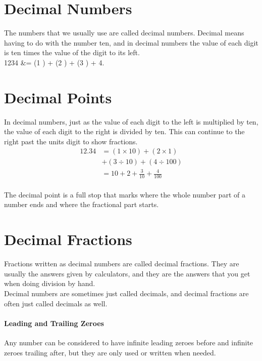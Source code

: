 \documentclass{article}
\author{}
\date{}
\begin{document}
\maketitle

\section{Decimal Numbers}
The numbers that we usually use are called decimal numbers. Decimal means having to do with the number ten, and in decimal numbers the value of each digit is ten times the value of the digit to its left.\\

1234 &= (1 ) + (2 ) + (3 ) + 4.\\

\section{Decimal Points}

In decimal numbers, just as the value of each digit to the left is multiplied by ten, the value of each digit to the right is divided by ten. This can continue to the right past the units digit to show fractions.
\begin{align*}
12.34 &= (1 \times 10) + (2 \times 1)\\
      &+ (3 \div 10) + (4 \div100)\\
      &= 10 + 2 + \frac{3}{10} + \frac{4}{100}\\
\end{align*}

The decimal point is a full stop that marks where the whole number part of a number ends and where the fractional part starts.\\

\section{Decimal Fractions}

Fractions written as decimal numbers are called decimal fractions. They are usually the answers given by calculators, and they are the answers that you get when doing division by hand.\\

Decimal numbers are sometimes just called decimals, and decimal fractions are often just called decimals as well.\\

\paragraph{Leading and Trailing Zeroes}
Any number can be considered to have infinite leading zeroes before and infinite zeroes trailing after, but they are only used or written when needed.\\
\end{document}
